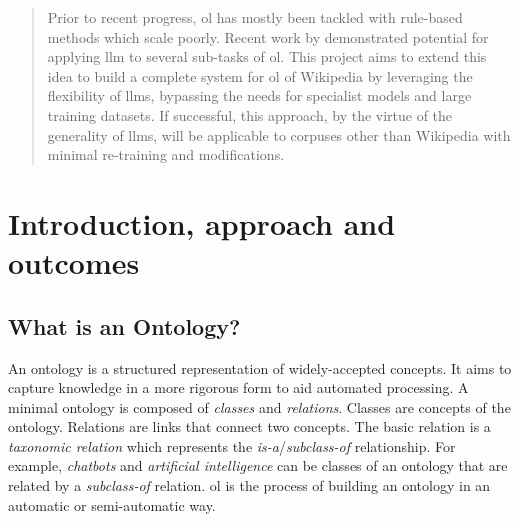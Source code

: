 
\begin{abstract}
    \noindent Prior to recent progress, \gls{ol} has mostly been tackled with rule-based methods which scale poorly. Recent work by \citet{llms4ol} demonstrated potential for applying \gls{llm} to several sub-tasks of \gls{ol}. This project aims to extend this idea to build a complete system for \gls{ol} of Wikipedia by leveraging the flexibility of \gls{llm}s, bypassing the needs for specialist models and large training datasets. If successful, this approach, by the virtue of the generality of \gls{llm}s, will be applicable to corpuses other than Wikipedia with minimal re-training and modifications.
\end{abstract}

\section*{Introduction, approach and outcomes}



\subsection*{What is an Ontology?}

An ontology is a structured representation of widely-accepted concepts. It aims to capture knowledge in a more rigorous form to aid automated processing. A minimal ontology is composed of \emph{classes} and \emph{relations}. Classes are concepts of the ontology. Relations are links that connect two concepts. The basic relation is a \emph{taxonomic relation} which represents the \emph{is-a}/\emph{subclass-of} relationship. For example, \emph{chatbots} and \emph{artificial intelligence} can be classes of an ontology that are related by a \emph{subclass-of} relation. \gls{ol} is the process of building an ontology in an automatic or semi-automatic way.

